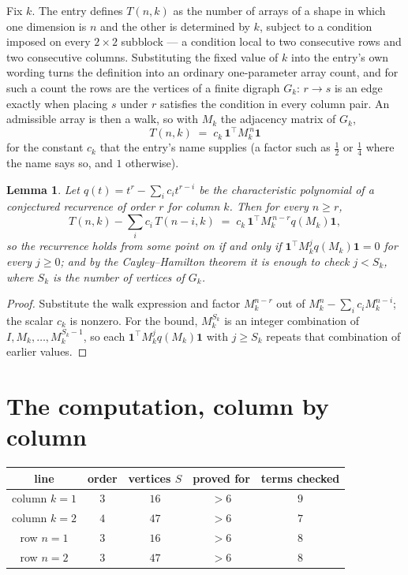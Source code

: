 \documentclass[11pt,a4paper]{article}
\theoremstyle{plain}
\newtheorem{lemma}[theorem]{Lemma}
\theoremstyle{definition}
\begin{document}
Fix $k$. The entry defines $T(n,k)$ as the number of arrays of a shape in which one dimension
is $n$ and the other is determined by $k$, subject to a condition imposed on every
$2\times2$ subblock --- a condition local to two consecutive rows and two consecutive columns.
Substituting the fixed value of $k$ into the entry's own wording turns the definition into an
ordinary one-parameter array count, and for such a count the rows are the vertices of a finite
digraph $G_k$: $r\to s$ is an edge exactly when placing $s$ under $r$ satisfies the condition
in every column pair. An admissible array is then a walk, so with $M_k$ the adjacency matrix
of $G_k$,
\[
T(n,k)\;=\;c_k\,\mathbf{1}^{\!\top}M_k^{\,n}\mathbf{1}
\]
for the constant $c_k$ that the entry's name supplies (a factor such as $\tfrac12$ or
$\tfrac14$ where the name says so, and $1$ otherwise).

\begin{lemma}\label{lem:crit}
Let $q(t)=t^{r}-\sum_i c_it^{r-i}$ be the characteristic polynomial of a conjectured
recurrence of order $r$ for column $k$. Then for every $n\ge r$,
\[
T(n,k)-\sum_i c_i\,T(n-i,k)\;=\;c_k\,\mathbf{1}^{\!\top}M_k^{\,n-r}q(M_k)\mathbf{1},
\]
so the recurrence holds from some point on if and only if
$\mathbf{1}^{\!\top}M_k^{j}q(M_k)\mathbf{1}=0$ for every $j\ge0$; and by the
Cayley--Hamilton theorem it is enough to check $j<S_k$, where $S_k$ is the number of vertices
of $G_k$.
\end{lemma}

\begin{proof}
Substitute the walk expression and factor $M_k^{n-r}$ out of $M_k^{n}-\sum_ic_iM_k^{n-i}$;
the scalar $c_k$ is nonzero. For the bound, $M_k^{S_k}$ is an integer combination of
$I,M_k,\dots,M_k^{S_k-1}$, so each $\mathbf{1}^{\!\top}M_k^{j}q(M_k)\mathbf{1}$ with
$j\ge S_k$ repeats that combination of earlier values.
\end{proof}

\section{The computation, column by column}

\begin{center}
\begin{tabular}{ccccc}
line & order & vertices $S$ & proved for & terms checked \\ \hline
column $k$$=1$ & $3$ & $16$ & $>6$ & $9$ \\
column $k$$=2$ & $4$ & $47$ & $>6$ & $7$ \\
row $n$$=1$ & $3$ & $16$ & $>6$ & $8$ \\
row $n$$=2$ & $3$ & $47$ & $>6$ & $8$ \\
\end{tabular}
\end{center}
\end{document}
